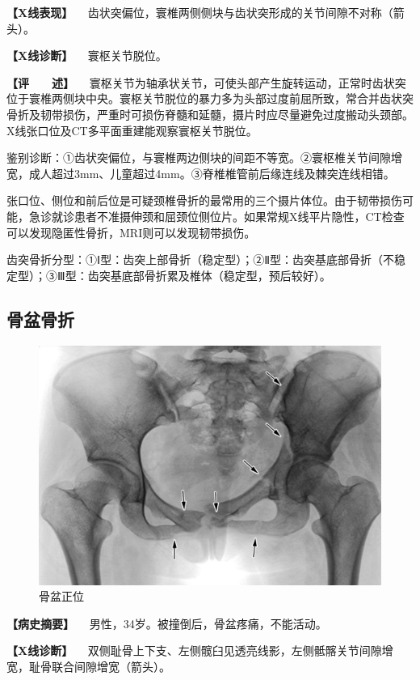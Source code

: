 \textbf{【X线表现】}
　齿状突偏位，寰椎两侧侧块与齿状突形成的关节间隙不对称（箭头）。

\textbf{【X线诊断】} 　寰枢关节脱位。

\textbf{【评　　述】}
　寰枢关节为轴承状关节，可使头部产生旋转运动，正常时齿状突位于寰椎两侧块中央。寰枢关节脱位的暴力多为头部过度前屈所致，常合并齿状突骨折及韧带损伤，严重时可损伤脊髓和延髓，摄片时应尽量避免过度搬动头颈部。X线张口位及CT多平面重建能观察寰枢关节脱位。

鉴别诊断：①齿状突偏位，与寰椎两边侧块的间距不等宽。②寰枢椎关节间隙增宽，成人超过3mm、儿童超过4mm。③脊椎椎管前后缘连线及棘突连线相错。

张口位、侧位和前后位是可疑颈椎骨折的最常用的三个摄片体位。由于韧带损伤可能，急诊就诊患者不准摄伸颈和屈颈位侧位片。如果常规X线平片隐性，CT检查可以发现隐匿性骨折，MRI则可以发现韧带损伤。

齿突骨折分型：①Ⅰ型：齿突上部骨折（稳定型）；②Ⅱ型：齿突基底部骨折（不稳定型）；③Ⅲ型：齿突基底部骨折累及椎体（稳定型，预后较好）。

\subsection{骨盆骨折}

\begin{figure}[!htbp]
 \centering
 \includegraphics{./images/Image00061.jpg}
 \captionsetup{justification=centering}
 \caption{骨盆正位}
 \label{fig2-3-34}
  \end{figure} 

\textbf{【病史摘要】} 　男性，34岁。被撞倒后，骨盆疼痛，不能活动。

\textbf{【X线诊断】}
　双侧耻骨上下支、左侧髋臼见透亮线影，左侧骶髂关节间隙增宽，耻骨联合间隙增宽（箭头）。

